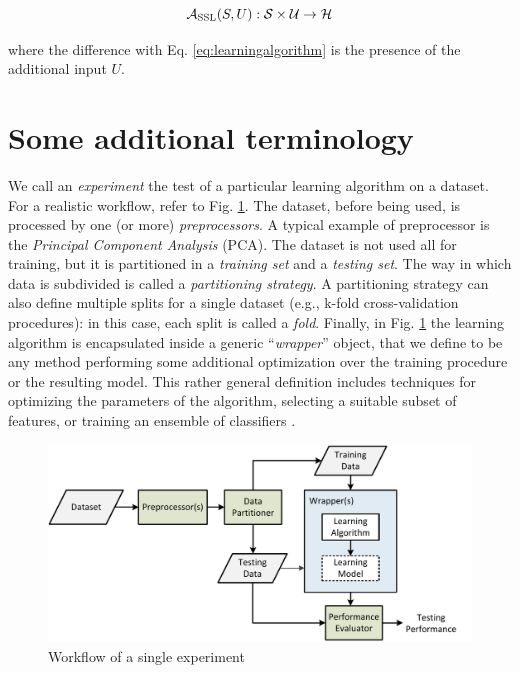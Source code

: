 \begin{equation}
\mathcal{A}_{\mbox{\scriptsize SSL}}(S,U): \mathcal{S} \times \mathcal{U} \rightarrow \mathcal{H}
\label{eq:ssl}
\end{equation}

\noindent where the difference with Eq. \eqref{eq:learningalgorithm} is the presence of the additional input $U$.

\section{Some additional terminology}

We call an \textit{experiment} the test of a particular learning algorithm on a dataset. For a realistic workflow, refer to Fig. \ref{fig:workflow}. The dataset, before being used, is processed by one (or more) \textit{preprocessors}. A typical example of preprocessor is the \textit{Principal Component Analysis} (PCA). The dataset is not used all for training, but it is partitioned in a \textit{training set} and a \textit{testing set}. The way in which data is subdivided is called a \textit{partitioning strategy}. A partitioning strategy can also define multiple splits for a single dataset (e.g., k-fold cross-validation procedures): in this case, each split is called a \textit{fold}. Finally, in Fig. \ref{fig:workflow} the learning algorithm is encapsulated inside a generic ``\textit{wrapper}'' object, that we define to be any method performing some additional optimization over the training procedure or the resulting model. This rather general definition includes techniques for optimizing the parameters of the algorithm, selecting a suitable subset of features, or training an ensemble of classifiers \cite{alpaydin2004introduction}.

\begin{figure}[t]
\centering
\includegraphics[scale=0.6]{./images/Disegno3}
\caption{Workflow of a single experiment}
\label{fig:workflow}
\end{figure}